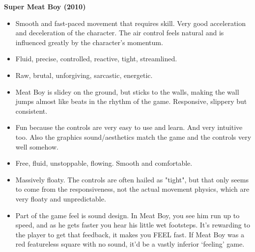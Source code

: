 \textbf{Super Meat Boy (2010)}
\vspace{-5mm}
\begin{itemize}[noitemsep,nolistsep]
\item Smooth and fast-paced movement that requires skill. Very good acceleration and deceleration of the character. The air control feels natural and is influenced greatly by the character's momentum. 
\item Fluid, precise, controlled, reactive, tight, streamlined.
\item Raw, brutal, unforgiving, sarcastic, energetic.
\item Meat Boy is slidey on the ground, but sticks to the walls, making the wall jumps almost like beats in the rhythm of the game. Responsive, slippery but consistent.
\item Fun because the controls are very easy to use and learn. And very intuitive too. Also the graphics sound/aesthetics match the game and the controls very well somehow.
\item Free, fluid, unstoppable, flowing. Smooth and comfortable.
\item Massively floaty. The controls are often hailed as "tight", but that only seems to come from the responsiveness, not the actual movement physics, which are very floaty and unpredictable.
\item Part of the game feel is sound design. In Meat Boy, you see him run up to speed, and as he gets faster you hear his little wet footsteps. It's rewarding to the player to get that feedback, it makes you FEEL fast. If Meat Boy was a red featureless square with no sound, it'd be a vastly inferior `feeling' game.
\end{itemize}

